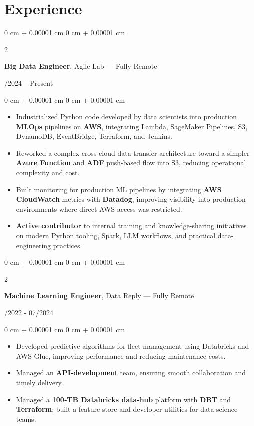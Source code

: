 \documentclass[10pt, letterpaper]{article}
\newenvironment{highlights}{
    \begin{itemize}[
        topsep=0.10 cm,
        parsep=0.10 cm,
        partopsep=0pt,
        itemsep=0pt,
        leftmargin=0 cm + 10pt
    ]
}{
    \end{itemize}
} %
\newenvironment{onecolentry}{
    \begin{adjustwidth}{
        0 cm + 0.00001 cm
    }{
        0 cm + 0.00001 cm
    }
}{
    \end{adjustwidth}
} %
\newenvironment{twocolentry}[2][]{
    \onecolentry
    \def\secondColumn{#2}
    \setcolumnwidth{\fill, 4.5 cm}
    \begin{paracol}{2}
}{
    \switchcolumn \raggedleft \secondColumn
    \end{paracol}
    \endonecolentry
} %
\begin{document}
    \section{Experience}

\begin{twocolentry}{09/2024 – Present}
    \textbf{Big Data Engineer}, Agile Lab — Fully Remote
\end{twocolentry}
\begin{onecolentry}
    \begin{highlights}
        \item Industrialized Python code developed by data scientists into production \textbf{MLOps} pipelines on \textbf{AWS}, integrating Lambda, SageMaker Pipelines, S3, DynamoDB, EventBridge, Terraform, and Jenkins.
        \item Reworked a complex cross-cloud data-transfer architecture toward a simpler \textbf{Azure Function} and \textbf{ADF} push-based flow into S3, reducing operational complexity and cost.
        \item Built monitoring for production ML pipelines by integrating \textbf{AWS CloudWatch} metrics with \textbf{Datadog}, improving visibility into production environments where direct AWS access was restricted.
        \item \textbf{Active contributor} to internal training and knowledge-sharing initiatives on modern Python tooling, Spark, LLM workflows, and practical data-engineering practices.

    \end{highlights}
\end{onecolentry}

\vspace{0.2 cm}

\begin{twocolentry}{05/2022 - 07/2024}
    \textbf{Machine Learning Engineer}, Data Reply — Fully Remote
\end{twocolentry}
\begin{onecolentry}
    \begin{highlights}
        \item Developed predictive algorithms for fleet management using Databricks and AWS Glue, improving performance and reducing maintenance costs.
        \item Managed an \textbf{API‑development} team, ensuring smooth collaboration and timely delivery.
        \item Managed a \textbf{100‑TB Databricks data‑hub} platform with \textbf{DBT} and \textbf{Terraform}; built a feature store and developer utilities for data‑science teams.
    \end{highlights}
\end{onecolentry}
\end{document}
